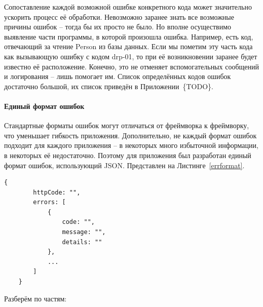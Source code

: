 \documentclass[a4paper,article]{article}
\begin{document}
    Сопоставление каждой возможной ошибке конкретного кода может значительно ускорить процесс её обработки. Невозможно заранее знать все возможные причины ошибок -- тогда бы их просто не было. Но вполне осуществимо выявление части программы, в которой произошла ошибка. Например, есть код, отвечающий за чтение Person из базы данных. Если мы пометим эту часть кода как вызывающую ошибку с кодом drp-01, то при её возникновении заранее будет известно её расположение. Конечно, это не отменяет вспомогательных сообщений и логирования -- лишь помогает им. Список определённых кодов ошибок достаточно большой, их список приведён в Приложении~\{TODO\}.

    \paragraph{Единый формат ошибок}\label{Единый формат ошибок}

    Стандартные форматы ошибок могут отличаться от фреймворка к фреймворку, что уменьшает гибкость приложения. Дополнительно, не каждый формат ошибок подходит для каждого приложения -- в некоторых много избыточной информации, в некоторых её недостаточно. Поэтому для приложения был разработан единый формат ошибок, использующий JSON. Представлен на Листинге~\ref{errformat}.

    \begin{lstlisting}[label=errformat,caption=Формат ошибок]
    {
        httpCode: "",
        errors: [
            {
                code: "",
                message: "",
                details: ""
            },
            ...
        ]
    }
    \end{lstlisting}

    Разберём по частям:
\end{document}
